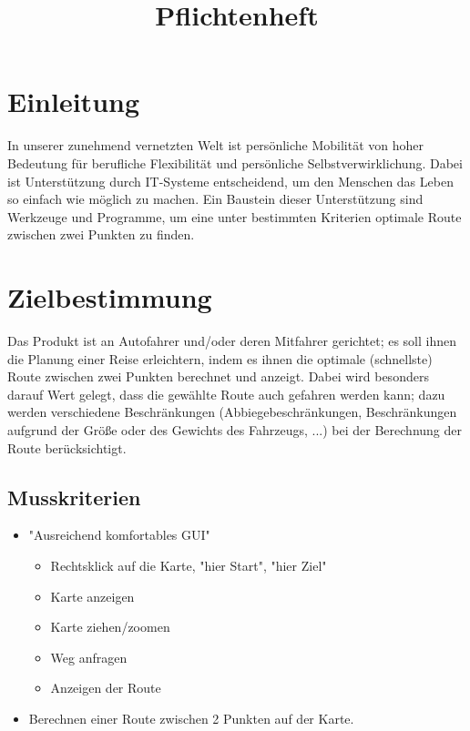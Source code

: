 \documentclass[a4paper, 11pt]{article}
\title{Pflichtenheft}
\begin{document}

\maketitle
\newpage
\tableofcontents
\newpage


\section{Einleitung}
In unserer zunehmend vernetzten Welt ist persönliche Mobilität von hoher Bedeutung für berufliche Flexibilität und persönliche Selbstverwirklichung. Dabei ist Unterstützung durch IT-Systeme entscheidend, um den Menschen das Leben so einfach wie möglich zu machen. Ein Baustein dieser Unterstützung sind Werkzeuge und Programme, um eine unter bestimmten Kriterien optimale Route zwischen zwei Punkten zu finden.

\section{Zielbestimmung}
Das Produkt ist an Autofahrer und/oder deren Mitfahrer gerichtet; es soll ihnen die Planung einer Reise erleichtern, indem es ihnen die optimale (schnellste) Route zwischen zwei Punkten berechnet und anzeigt.
Dabei wird besonders darauf Wert gelegt, dass die gewählte Route auch gefahren werden kann; dazu werden verschiedene Beschränkungen (Abbiegebeschränkungen, Beschränkungen aufgrund der Größe oder des Gewichts des Fahrzeugs, ...) bei der Berechnung der Route berücksichtigt.

\subsection{Musskriterien}
\begin{itemize}
\item "Ausreichend komfortables GUI"
\begin{itemize}
\item Rechtsklick auf die Karte, "hier Start", "hier Ziel"
\item Karte anzeigen
\item Karte ziehen/zoomen
\item Weg anfragen
\item Anzeigen der Route
\end{itemize}
\item Berechnen einer Route zwischen 2 Punkten auf der Karte.
\end{itemize}
\end{document}
